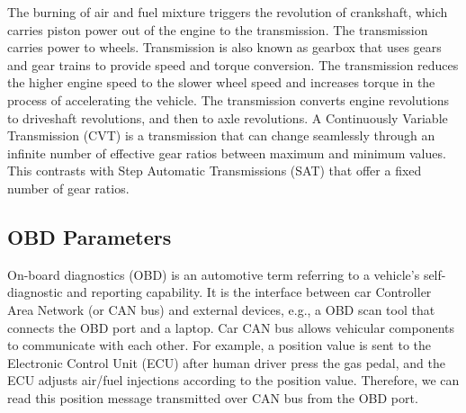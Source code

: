 The burning of air and fuel mixture triggers the revolution of 
crankshaft, which carries piston power out of the engine to the transmission.
The transmission carries power to wheels.  
Transmission is also known as gearbox that uses gears and gear trains
to provide speed and torque conversion. 
The transmission reduces the higher engine speed to the slower
wheel speed and increases torque in the process of accelerating the vehicle. 
The transmission converts engine revolutions to driveshaft revolutions, and then to axle revolutions.
A Continuously Variable Transmission (CVT) is a 
transmission that can change 
seamlessly through an infinite number of effective gear ratios 
between maximum and minimum values. 
This contrasts with Step 
Automatic Transmissions (SAT) that offer a fixed number of gear ratios.

\subsection{OBD Parameters}

On-board diagnostics (OBD) is an automotive 
term referring to a vehicle's 
self-diagnostic and reporting capability.  
It is the interface between car Controller Area Network (or CAN bus) and external devices, 
e.g., a OBD scan tool that connects the OBD port and a laptop. 
Car CAN bus allows vehicular components to communicate with each other. 
For example, a position value is sent to 
the Electronic Control Unit (ECU) after human driver
press the gas pedal, 
and the ECU adjusts air/fuel injections according to the position value.
Therefore, we can read this position message transmitted over CAN bus 
from the OBD port. 






